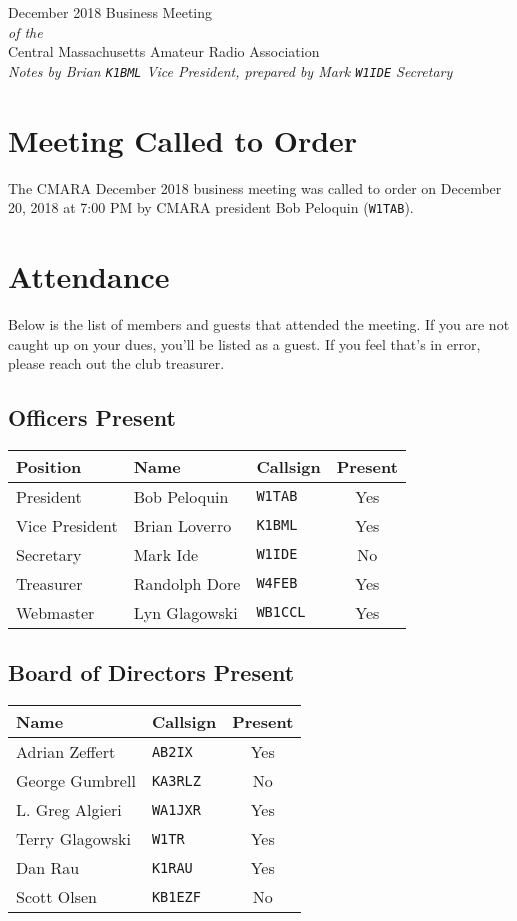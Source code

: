 \documentclass[10pt,letterpaper]{article}
\begin{document}
\begin{center}
{\huge December 2018 Business Meeting}\\
\emph{of the}\\
{\Large Central Massachusetts Amateur Radio Association}\\
\emph{Notes by Brian \texttt{K1BML} Vice President, prepared by Mark \texttt{W1IDE} Secretary}
\end{center}

\section{Meeting Called to Order}
The CMARA December 2018 business meeting was called to order on December 20, 2018 at 7:00 PM by CMARA president Bob Peloquin (\texttt{W1TAB}).

\section{Attendance}
\noindent
Below is the list of members and guests that attended the meeting. If you are not caught up on your dues, you'll be listed as a guest. If you feel that's in error, please reach out the club treasurer.

\subsection{Officers Present}
\begin{tabular}{|l|l|l|c|}
  \hline
  \textbf{Position} & \textbf{Name}  & \textbf{Callsign} & \textbf{Present} \\ \hline
  President         & Bob Peloquin   & \texttt{W1TAB}    & Yes \\
  Vice President    & Brian Loverro  & \texttt{K1BML}    & Yes \\
  Secretary         & Mark Ide       & \texttt{W1IDE}    & No  \\
  Treasurer         & Randolph Dore  & \texttt{W4FEB}    & Yes \\
  Webmaster         & Lyn Glagowski  & \texttt{WB1CCL}   & Yes \\
  \hline
\end{tabular}

\subsection{Board of Directors Present}
\begin{tabular}{|l|l|c|}
  \hline
  \textbf{Name}     & \textbf{Callsign} & \textbf{Present} \\ \hline
  Adrian Zeffert  & \texttt{AB2IX}    & Yes \\
  George Gumbrell & \texttt{KA3RLZ}   & No  \\
  L. Greg Algieri & \texttt{WA1JXR}   & Yes \\
  Terry Glagowski & \texttt{W1TR}     & Yes \\
  Dan Rau         & \texttt{K1RAU}    & Yes \\
  Scott Olsen     & \texttt{KB1EZF}   & No  \\
  \hline
\end{tabular}
\end{document}
